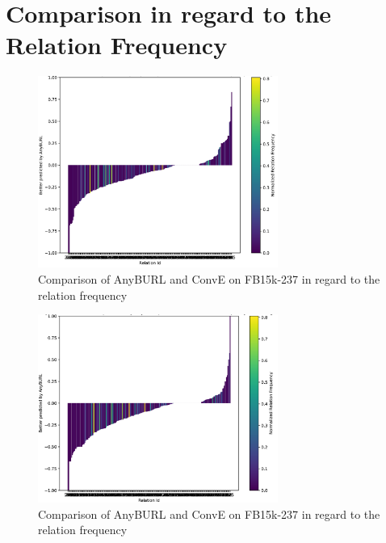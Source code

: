 \section{Comparison in regard to the Relation Frequency}
\label{appendix:relation_freq_fb15k}

\begin{figure}[H]
\centering
\includegraphics[width=0.7\textwidth]{images/relation_freq_anyburl_conve_fb15k.PNG}
\caption{Comparison of AnyBURL and ConvE on FB15k-237 in regard to the relation frequency}
\label{fig:relation_freq_anyburl_conve_fb15k}
\end{figure}

\begin{figure}[H]
\centering
\includegraphics[width=0.7\textwidth]{images/relation_freq_anyburl_rescal_fb15k.PNG}
\caption{Comparison of AnyBURL and ConvE on FB15k-237 in regard to the relation frequency}
\label{fig:relation_freq_anyburl_rescal_fb15k}
\end{figure}